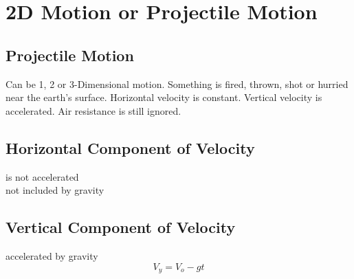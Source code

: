 \section{ 2D Motion or Projectile Motion}

\subsection{Projectile Motion}
Can be 1, 2 or 3-Dimensional motion. Something is fired, thrown, shot or hurried near the earth's surface. Horizontal velocity is constant. Vertical velocity is accelerated. Air resistance is still ignored.

\subsection{Horizontal Component of Velocity}
is not accelerated\\
not included by gravity

\subsection{Vertical Component of Velocity }
accelerated by gravity
\[V_y=V_o-gt\]